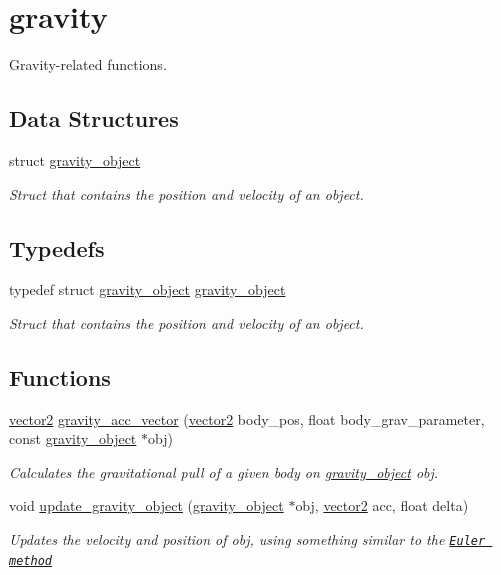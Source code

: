 \hypertarget{group__gravity}{}\section{gravity}
\label{group__gravity}


Gravity-\/related functions.  


\subsection*{Data Structures}
\begin{DoxyCompactItemize}
\item 
struct \hyperlink{structgravity__object}{gravity\+\_\+object}
\begin{DoxyCompactList}\small\item\em Struct that contains the position and velocity of an object. \end{DoxyCompactList}\end{DoxyCompactItemize}
\subsection*{Typedefs}
\begin{DoxyCompactItemize}
\item 
typedef struct \hyperlink{structgravity__object}{gravity\+\_\+object} \hyperlink{group__gravity_ga5aec6ca0c05d29e1a2708c89b0f27228}{gravity\+\_\+object}
\begin{DoxyCompactList}\small\item\em Struct that contains the position and velocity of an object. \end{DoxyCompactList}\end{DoxyCompactItemize}
\subsection*{Functions}
\begin{DoxyCompactItemize}
\item 
\hyperlink{structvector2}{vector2} \hyperlink{group__gravity_gadecebe4cd578161d35b325249079f7b9}{gravity\+\_\+acc\+\_\+vector} (\hyperlink{structvector2}{vector2} body\+\_\+pos, float body\+\_\+grav\+\_\+parameter, const \hyperlink{structgravity__object}{gravity\+\_\+object} $\ast$obj)
\begin{DoxyCompactList}\small\item\em Calculates the gravitational pull of a given body on \hyperlink{structgravity__object}{gravity\+\_\+object} obj. \end{DoxyCompactList}\item 
void \hyperlink{group__gravity_ga2cf5adbf1029afdd7b7cdd00eadc8771}{update\+\_\+gravity\+\_\+object} (\hyperlink{structgravity__object}{gravity\+\_\+object} $\ast$obj, \hyperlink{structvector2}{vector2} acc, float delta)
\begin{DoxyCompactList}\small\item\em Updates the velocity and position of obj, using something similar to the \href{https://en.wikipedia.org/wiki/Euler_method}{\tt Euler method} \end{DoxyCompactList}\end{DoxyCompactItemize}


